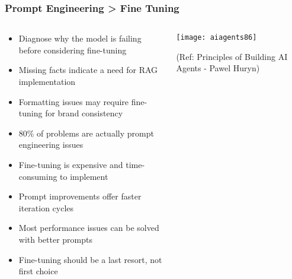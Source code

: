 \begin{frame}[fragile]\frametitle{Prompt Engineering > Fine Tuning}
\begin{columns}
    \begin{column}[T]{0.6\linewidth}
      \begin{itemize}
		\item Diagnose why the model is failing before considering fine-tuning
		\item Missing facts indicate a need for RAG implementation
		\item Formatting issues may require fine-tuning for brand consistency
		\item 80\% of problems are actually prompt engineering issues
		\item Fine-tuning is expensive and time-consuming to implement
		\item Prompt improvements offer faster iteration cycles
		\item Most performance issues can be solved with better prompts
		\item Fine-tuning should be a last resort, not first choice
	  \end{itemize}
    \end{column}
    \begin{column}[T]{0.4\linewidth}
		\begin{center}
		\texttt{[image: aiagents86]}
		
		{\tiny (Ref: Principles of Building AI Agents - Pawel Huryn)}
		\end{center}	
    \end{column}
  \end{columns}
\end{frame}

